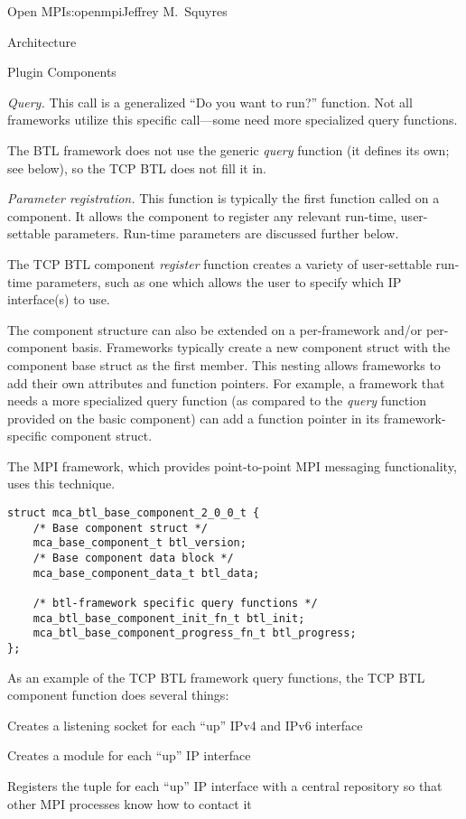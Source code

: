 \begin{aosachapter}{Open MPI}{s:openmpi}{Jeffrey M.\ Squyres}
\begin{aosasect1}{Architecture}
\begin{aosasect2}{Plugin Components}
\begin{aosaitemize}
\item \emph{Query.} This call is a generalized ``Do you want to run?''
  function.  Not all frameworks utilize this specific call---some
  need more specialized query functions.

  The BTL framework does not use the generic \emph{query} function (it
  defines its own; see below), so the TCP BTL does not fill it in.

\item \emph{Parameter registration.} This function is typically the
  first function called on a component.  It allows the component to
  register any relevant run-time, user-settable parameters.  Run-time
  parameters are discussed further below.

  The TCP BTL component \emph{register} function creates a variety of
  user-settable run-time parameters, such as one which allows the
  user to specify which IP interface(s) to use.
\end{aosaitemize}

The component structure can also be extended on a per-framework and/or
per-component basis.  Frameworks typically create a new component
struct with the component base struct as the first member.
%
This nesting allows frameworks to add their own attributes and
function pointers.  
%
For example, a framework that needs a more specialized query function
(as compared to the \emph{query} function provided on the basic
component) can add a function pointer in its framework-specific
component struct.

The MPI  framework, which provides point-to-point MPI
messaging functionality, uses this technique.

\begin{verbatim}
struct mca_btl_base_component_2_0_0_t {
    /* Base component struct */
    mca_base_component_t btl_version;
    /* Base component data block */
    mca_base_component_data_t btl_data;

    /* btl-framework specific query functions */
    mca_btl_base_component_init_fn_t btl_init;
    mca_btl_base_component_progress_fn_t btl_progress;
};
\end{verbatim}

As an example of the TCP BTL framework query functions, the TCP BTL
component  function does several things:

\begin{aosaitemize}
\item Creates a listening socket for each ``up'' IPv4 and IPv6 interface
\item Creates a module for each ``up'' IP interface
\item Registers the tuple  for each ``up'' IP
  interface with a central repository so that other MPI processes know
  how to contact it
\end{aosaitemize}


\end{aosasect2}
\end{aosasect1}
\end{aosachapter}

